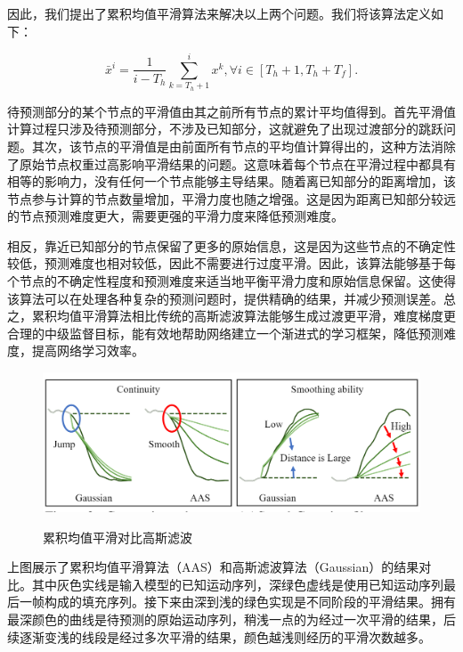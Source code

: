 因此，我们提出了累积均值平滑算法来解决以上两个问题。我们将该算法定义如下：

\begin{equation}
    \bar{x}^i = \frac{1}{i-T_h}\sum_{k=T_h+1}^{i}x^k, \forall i\in[T_h+1, T_h+T_f].
    \label{equation:AAS}
\end{equation}

待预测部分的某个节点的平滑值由其之前所有节点的累计平均值得到。首先平滑值计算过程只涉及待预测部分，不涉及已知部分，这就避免了出现过渡部分的跳跃问题。其次，该节点的平滑值是由前面所有节点的平均值计算得出的，这种方法消除了原始节点权重过高影响平滑结果的问题。这意味着每个节点在平滑过程中都具有相等的影响力，没有任何一个节点能够主导结果。随着离已知部分的距离增加，该节点参与计算的节点数量增加，平滑力度也随之增强。这是因为距离已知部分较远的节点预测难度更大，需要更强的平滑力度来降低预测难度。

相反，靠近已知部分的节点保留了更多的原始信息，这是因为这些节点的不确定性较低，预测难度也相对较低，因此不需要进行过度平滑。因此，该算法能够基于每个节点的不确定性程度和预测难度来适当地平衡平滑力度和原始信息保留。这使得该算法可以在处理各种复杂的预测问题时，提供精确的结果，并减少预测误差。总之，累积均值平滑算法相比传统的高斯滤波算法能够生成过渡更平滑，难度梯度更合理的中级监督目标，能有效地帮助网络建立一个渐进式的学习框架，降低预测难度，提高网络学习效率。

\begin{figure}[ht]
    \centering
    \includegraphics[width=1\textwidth]{FigMa/AAS.png}\\
    \vspace{-0.3cm}
    \caption{累积均值平滑对比高斯滤波}
    \label{fig:AAS}
\end{figure}
上图展示了累积均值平滑算法（AAS）和高斯滤波算法（Gaussian）的结果对比。其中灰色实线是输入模型的已知运动序列，深绿色虚线是使用已知运动序列最后一帧构成的填充序列。接下来由深到浅的绿色实现是不同阶段的平滑结果。拥有最深颜色的曲线是待预测的原始运动序列，稍浅一点的为经过一次平滑的结果，后续逐渐变浅的线段是经过多次平滑的结果，颜色越浅则经历的平滑次数越多。

